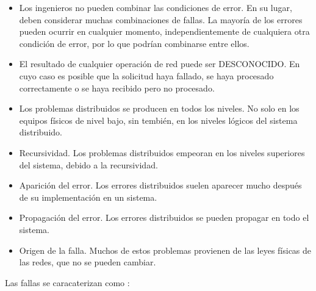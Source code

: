 \begin{itemize}
	\item { Los ingenieros no pueden combinar las condiciones de error}. En su lugar, deben considerar muchas combinaciones de fallas. La mayoría de los errores pueden ocurrir en cualquier momento, independientemente de cualquiera otra condición de error, por lo que podrían combinarse entre ellos.
	
	\item {El resultado de cualquier operación de red puede ser DESCONOCIDO}. En cuyo caso es posible que la solicitud haya fallado, se haya procesado correctamente o se haya recibido pero no procesado.
	
	\item  {Los problemas distribuidos se producen en todos los niveles}. No solo en los equipos físicos de nivel bajo, sin tembi\'en, en los niveles lógicos del sistema distribuido.
	
	\item {Recursividad}.  Los problemas distribuidos empeoran en los niveles superiores del sistema, debido a la recursividad. 
	
	\item {Aparición del error}. Los errores distribuidos suelen aparecer mucho después de su implementación en un sistema.
	
	\item {Propagación del error}. Los errores distribuidos se pueden propagar en todo el sistema. 
	
	\item  {Origen de la falla}. Muchos de estos problemas provienen de las leyes físicas de las redes, que no se pueden cambiar.
\end{itemize}
Las fallas se caracaterizan como \cite{Coulouris2011}:
	
